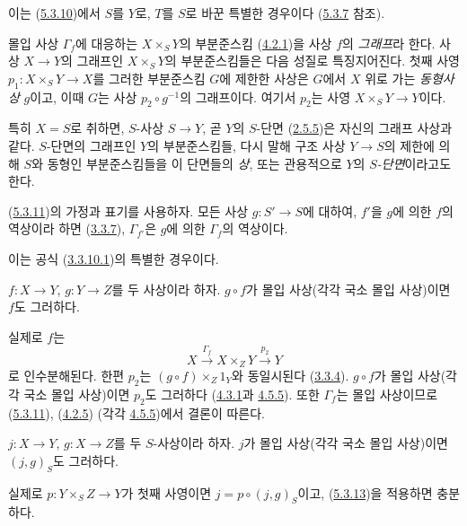 이는 (\hyperref[I.5.3.10-ko]{5.3.10})에서 $S$를 $Y$로, $T$를 $S$로
바꾼 특별한 경우이다 (\hyperref[I.5.3.7-ko]{5.3.7} 참조).

몰입 사상 $\Gamma_f$에 대응하는 $X\times_S Y$의 부분준스킴
(\hyperref[I.4.2.1-ko]{4.2.1})을 사상 $f$의 \emph{그래프}라 한다.
사상 $X\to Y$의 그래프인 $X\times_S Y$의 부분준스킴들은 다음
성질로 특징지어진다. 첫째 사영 $p_1:X\times_S Y\to X$를 그러한
부분준스킴 $G$에 제한한 사상은 $G$에서 $X$ 위로 가는
\emph{동형사상} $g$이고, 이때 $G$는 사상 $p_2\circ g^{-1}$의
그래프이다. 여기서 $p_2$는 사영 $X\times_S Y\to Y$이다.

특히 $X=S$로 취하면, $S$-사상 $S\to Y$, 곧 $Y$의 $S$-단면
(\hyperref[I.2.5.5-ko]{2.5.5})은 자신의 그래프 사상과 같다.
$S$-단면의 그래프인 $Y$의 부분준스킴들, 다시 말해 구조 사상
$Y\to S$의 제한에 의해 $S$와 동형인 부분준스킴들을 이 단면들의
\emph{상}, 또는 관용적으로 $Y$의 \emph{$S$-단면}이라고도 한다.

\begin{corollary}[5.3.12]
\label{I.5.3.12-ko}
(\hyperref[I.5.3.11-ko]{5.3.11})의 가정과 표기를 사용하자. 모든 사상
$g:S'\to S$에 대하여, $f'$을 $g$에 의한 $f$의 역상이라 하면
(\hyperref[I.3.3.7-ko]{3.3.7}), $\Gamma_{f'}$은 $g$에 의한
$\Gamma_f$의 역상이다.
\end{corollary}

이는 공식 (\hyperref[I.3.3.10.1-ko]{3.3.10.1})의 특별한 경우이다.

\begin{corollary}[5.3.13]
\label{I.5.3.13-ko}
$f:X\to Y$, $g:Y\to Z$를 두 사상이라 하자. $g\circ f$가 몰입
사상(각각 국소 몰입 사상)이면 $f$도 그러하다.
\end{corollary}

실제로 $f$는
\[
  X\xrightarrow{\Gamma_f}X\times_Z Y\xrightarrow{p_2}Y
\]
로 인수분해된다. 한편 $p_2$는 $(g\circ f)\times_Z 1_Y$와
동일시된다 (\hyperref[I.3.3.4-ko]{3.3.4}). $g\circ f$가 몰입
사상(각각 국소 몰입 사상)이면 $p_2$도 그러하다
(\hyperref[I.4.3.1-ko]{4.3.1}과 \hyperref[I.4.5.5-ko]{4.5.5}). 또한
$\Gamma_f$는 몰입 사상이므로 (\hyperref[I.5.3.11-ko]{5.3.11}),
(\hyperref[I.4.2.5-ko]{4.2.5}) (각각
\hyperref[I.4.5.5-ko]{4.5.5})에서 결론이 따른다.

\begin{corollary}[5.3.14]
\label{I.5.3.14-ko}
$j:X\to Y$, $g:X\to Z$를 두 $S$-사상이라 하자. $j$가 몰입
사상(각각 국소 몰입 사상)이면 $(j,g)_S$도 그러하다.
\end{corollary}

실제로 $p:Y\times_S Z\to Y$가 첫째 사영이면
$j=p\circ(j,g)_S$이고, (\hyperref[I.5.3.13-ko]{5.3.13})을 적용하면
충분하다.

